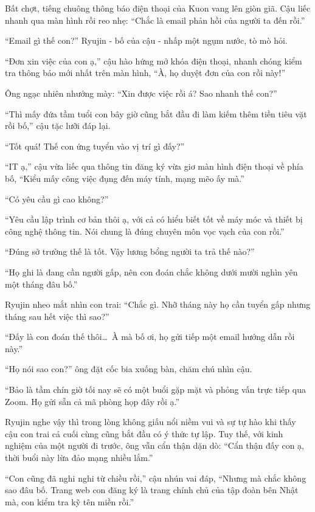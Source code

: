 \documentclass[../main.tex]{subfiles}
\begin{document}
Bất chợt, tiếng chuông thông báo điện thoại của Kuon vang lên giòn giã. Cậu liếc nhanh qua màn hình rồi reo nhẹ: ``Chắc là email phản hồi của người ta đến rồi.''

``Email gì thế con?'' Ryujin - bố của cậu - nhấp một ngụm nước, tò mò hỏi.

``Đơn xin việc của con ạ,'' cậu hào hứng mở khóa điện thoại, nhanh chóng kiểm tra thông báo mới nhất trên màn hình, ``À, họ duyệt đơn của con rồi này!''

Ông ngạc nhiên nhướng mày: ``Xin được việc rồi á? Sao nhanh thế con?''

``Thì mấy đứa tầm tuổi con bây giờ cũng bắt đầu đi làm kiếm thêm tiền tiêu vặt rồi bố,'' cậu tặc lưỡi đáp lại.

``Tốt quá! Thế con ứng tuyển vào vị trí gì đấy?''

``IT ạ,'' cậu vừa liếc qua thông tin đăng ký vừa giơ màn hình điện thoại về phía bố, ``Kiểu mấy công việc đụng đến máy tính, mạng mẽo ấy mà.''

``Có yêu cầu gì cao không?''

``Yêu cầu lập trình cơ bản thôi ạ, với cả có hiểu biết tốt về máy móc và thiết bị công nghệ thông tin. Nói chung là đúng chuyên môn vọc vạch của con rồi.''

``Đúng sở trường thế là tốt. Vậy lương bổng người ta trả thế nào?''

``Họ ghi là đang cần người gấp, nên con đoán chắc không dưới mười nghìn yên một tháng đâu bố.''

Ryujin nheo mắt nhìn con trai: ``Chắc gì. Nhỡ tháng này họ cần tuyển gấp nhưng tháng sau hết việc thì sao?''

``Đấy là con đoán thế thôi\dots\ À mà bố ơi, họ gửi tiếp một email hướng dẫn rồi này.''

``Họ nói sao con?'' ông đặt cốc bia xuống bàn, chăm chú nhìn cậu.

``Bảo là tầm chín giờ tối nay sẽ có một buổi gặp mặt và phỏng vấn trực tiếp qua Zoom. Họ gửi sẵn cả mã phòng họp đây rồi ạ.''

Ryujin nghe vậy thì trong lòng không giấu nổi niềm vui và sự tự hào khi thấy cậu con trai cả cuối cùng cũng bắt đầu có ý thức tự lập. Tuy thế, với kinh nghiệm của một người đi trước, ông vẫn cẩn thận dặn dò: ``Cẩn thận đấy con ạ, thời buổi này lừa đảo mạng nhiều lắm.''

``Con cũng đã nghi nghi từ chiều rồi,'' cậu nhún vai đáp, ``Nhưng mà chắc không sao đâu bố. Trang web con đăng ký là trang chính chủ của tập đoàn bên Nhật mà, con kiểm tra kỹ tên miền rồi.''
\end{document}

